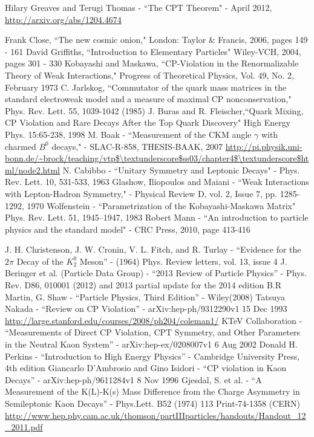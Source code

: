 \documentclass[floatfix,aps,prd,amsmath,amssymb]{revtex4}
\begin{document}
\begin{thebibliography}{10}
Hilary Greaves and Terugi Thomas - ``The CPT Theorem" - April 2012, \url{http://arxiv.org/abs/1204.4674}

Frank Close, ``The new cosmic onion,"  London: Taylor \& Francis, 2006, pages 149 - 161
David Griffiths, ``Introduction to Elementary Particles"  Wiley-VCH, 2004, pages 301 - 330
Kobayashi and Maskawa, ``CP-Violation in the Renormalizable Theory of Weak Interactions," Progress of Theoretical Physics, Vol. 49, No. 2, February 1973
C. Jarlskog, ``Commutator of the quark mass matrices in the standard electroweak model and a measure of maximal CP nonconservation," Phys. Rev. Lett. 55, 1039-1042 (1985)
J. Buras and R. Fleischer,``Quark Mixing, CP Violation and Rare Decays After the Top Quark Discovery" High Energy Phys. 15:65-238, 1998
M. Baak - ``Measurement of the CKM angle $\gamma$ with charmed $B^{0}$ decays," - SLAC-R-858, THESIS-BAAK, 2007
\url{http://pi.physik.uni-bonn.de/~brock/teaching/vtp$\textunderscore$ss03/chapter4$\textunderscore$html/node2.html}
N. Cabibbo - ``Unitary Symmetry and Leptonic Decays" - Phys. Rev. Lett. 10, 531-533, 1963
Glashow, Iliopoulos and Maiani - ``Weak Interactions with Lepton-Hadron Symmetry," - Physical Review D, vol. 2, Issue 7, pp. 1285-1292, 1970
Wolfenstein - ``Parametrization of the Kobayashi-Maskawa Matrix" Phys. Rev. Lett. 51, 1945–1947, 1983 
Robert Mann - ``An introduction to particle physics and the standard model" - CRC Press, 2010, page 413-416

J. H. Christenson, J. W. Cronin, V. L. Fitch, and R. Turlay - ``Evidence for the $2 \pi$ Decay of the $K^0_2$ Meson'' - (1964) Phys. Review letters, vol. 13, issue 4
J. Beringer et al. (Particle Data Group) - ``2013 Review of Particle Physics'' - Phys. Rev. D86, 010001 (2012) and 2013 partial update for the 2014 edition 
B.R Martin, G. Shaw - ``Particle Physics, Third Edition'' - Wiley(2008)  
Tatsuya Nakada - ``Review on CP Violation'' - arXiv:hep-ph/9312290v1 15 Dec 1993
\url{http://large.stanford.edu/courses/2008/ph204/coleman1/}  
KTeV Collaboration - ``Measurements of Direct CP Violation, CPT Symmetry, and Other Parameters in the Neutral Kaon System'' - arXiv:hep-ex/0208007v1 6 Aug 2002 
Donald H. Perkins - ``Introduction to High Energy Physics'' - Cambridge University Press, 4th edition 
Giancarlo D’Ambrosio and Gino Isidori - ``CP violation in Kaon Decays'' - arXiv:hep-ph/9611284v1 8 Nov 1996
Gjesdal, S. et al. - ``A Measurement of the K(L)-K(s) Mass Difference from the Charge Asymmetry in Semileptonic Kaon Decays'' - Phys.Lett. B52 (1974) 113 Print-74-1358 (CERN) 
\url{http://www.hep.phy.cam.ac.uk/thomson/partIIIparticles/handouts/Handout\_12\_2011.pdf}


\end{thebibliography}
\end{document}
